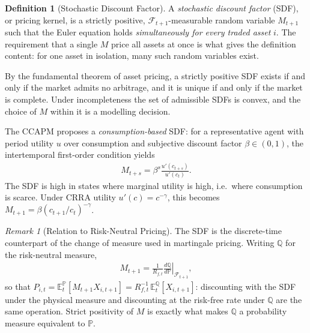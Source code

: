 \documentclass[11pt]{article}
\theoremstyle{definition}
\newtheorem{definition}{Definition}[section]
\theoremstyle{plain}
\theoremstyle{remark}
\newtheorem{remark}{Remark}[section]
\begin{document}
\begin{definition}[Stochastic Discount Factor]
    A \textit{stochastic discount factor} (SDF), or pricing kernel, is a strictly positive, $\mathcal{F}_{t+1}$-measurable random variable $M_{t+1}$ such that the Euler equation holds \emph{simultaneously for every traded asset} $i$. The requirement that a single $M$ price all assets at once is what gives the definition content: for one asset in isolation, many such random variables exist.

    By the fundamental theorem of asset pricing, a strictly positive SDF exists if and only if the market admits no arbitrage, and it is unique if and only if the market is complete. Under incompleteness the set of admissible SDFs is convex, and the choice of $M$ within it is a modelling decision.

    The CCAPM proposes a \emph{consumption-based} SDF: for a representative agent with period utility $u$ over consumption and subjective discount factor $\beta \in (0,1)$, the intertemporal first-order condition yields
    \begin{align}
        M_{t+s} = \beta^s \frac{u'(c_{t+s})}{u'(c_t)}.
    \end{align}
    The SDF is high in states where marginal utility is high, i.e.\ where consumption is scarce. Under CRRA utility $u'(c) = c^{-\gamma}$, this becomes $M_{t+1} = \beta (c_{t+1}/c_t)^{-\gamma}$.
\end{definition}

\begin{remark}[Relation to Risk-Neutral Pricing]
    The SDF is the discrete-time counterpart of the change of measure used in martingale pricing. Writing $\mathbb{Q}$ for the risk-neutral measure,
    \begin{align}
        M_{t+1} = \frac{1}{R_{f,t}} \left.\frac{d\mathbb{Q}}{d\mathbb{P}}\right|_{\mathcal{F}_{t+1}},
    \end{align}
    so that $P_{i,t} = \mathbb{E}^{\mathbb{P}}_t[M_{t+1}X_{i,t+1}] = R_{f,t}^{-1}\,\mathbb{E}^{\mathbb{Q}}_t[X_{i,t+1}]$: discounting with the SDF under the physical measure and discounting at the risk-free rate under $\mathbb{Q}$ are the same operation. Strict positivity of $M$ is exactly what makes $\mathbb{Q}$ a probability measure equivalent to $\mathbb{P}$.
\end{remark}
\end{document}
